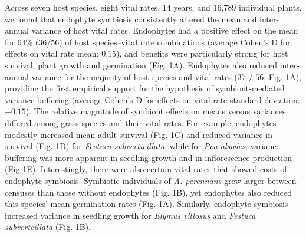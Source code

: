 \documentclass[12pt]{article}
\begin{document}
Across seven host species, eight vital rates, 14 years, and 16,789 individual plants, we found that endophyte symbiosis consistently altered the mean and inter-annual variance of host vital rates. 
Endophytes had a positive effect on the mean for $64$\% ($36$/$56$) of host species--vital rate combinations (average Cohen's D for effects on vital rate mean: $0.15$), and benefits were particularly strong for host survival, plant growth and germination (Fig. 1A).
Endophytes also reduced inter-annual variance for the majority of host species and vital rates ($37$ / $56$; Fig. 1A), providing the first empirical support for the hypothesis of symbiont-mediated variance buffering (average Cohen's D for effects on vital rate standard deviation: $-0.15$).
The relative magnitude of symbiont effects on means versus variances differed among grass species and their vital rates.
For example, endophytes modestly increased mean adult survival (Fig. 1C) and reduced variance in survival (Fig. 1D) for \emph{Festuca subverticillata}, while for \emph{Poa alsodes}, variance buffering was more apparent in seedling growth and in inflorescence production (Fig 1E). 
Interestingly, there were also certain vital rates that showed costs of endophyte symbiosis. 
Symbiotic individuals of \emph{A. perennans} grew larger between censuses than those without endophytes (Fig. 1B), yet endophytes also reduced this species' mean germination rates (Fig. 1A). 
Similarly, endophyte symbiosis increased variance in seedling growth for \emph{Elymus villosus} and \emph{Festuca subvertcillata} (Fig. 1B).
 
\end{document}
